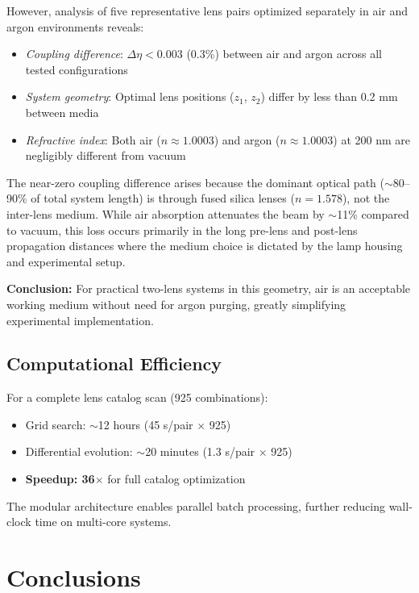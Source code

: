 However, analysis of five representative lens pairs optimized separately in air and argon environments reveals:

\begin{itemize}[leftmargin=*]
    \item \textit{Coupling difference}: $\Delta\eta < 0.003$ (0.3\%) between air and argon across all tested configurations
    \item \textit{System geometry}: Optimal lens positions ($z_1$, $z_2$) differ by less than 0.2 mm between media
    \item \textit{Refractive index}: Both air ($n \approx 1.0003$) and argon ($n \approx 1.0003$) at 200 nm are negligibly different from vacuum
\end{itemize}

The near-zero coupling difference arises because the dominant optical path ($\sim$80--90\% of total system length) is through fused silica lenses ($n = 1.578$), not the inter-lens medium. While air absorption attenuates the beam by $\sim$11\% compared to vacuum, this loss occurs primarily in the long pre-lens and post-lens propagation distances where the medium choice is dictated by the lamp housing and experimental setup.

\textbf{Conclusion:} For practical two-lens systems in this geometry, air is an acceptable working medium without need for argon purging, greatly simplifying experimental implementation.

\subsection{Computational Efficiency}

For a complete lens catalog scan (925 combinations):
\begin{itemize}[leftmargin=*]
    \item Grid search: $\sim$12 hours (45 s/pair $\times$ 925)
    \item Differential evolution: $\sim$20 minutes (1.3 s/pair $\times$ 925)
    \item \textbf{Speedup: 36$\times$} for full catalog optimization
\end{itemize}

The modular architecture enables parallel batch processing, further reducing wall-clock time on multi-core systems.

\section{Conclusions}

